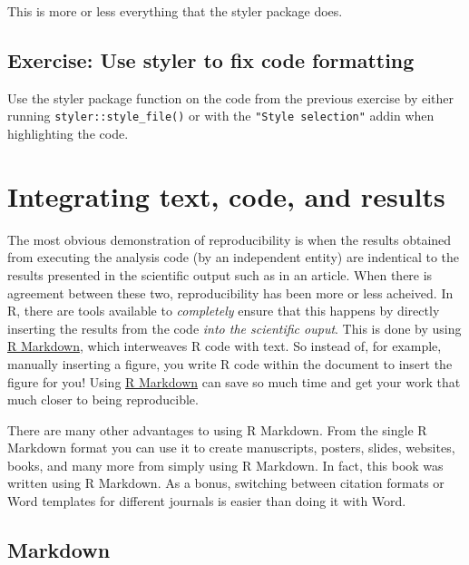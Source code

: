 \documentclass[]{Nemilov}
\begin{document}
This is more or less everything that the styler package does.

\hypertarget{exercise-use-styler-to-fix-code-formatting}{%
\subsection{Exercise: Use styler to fix code formatting}\label{exercise-use-styler-to-fix-code-formatting}}

Use the styler package function on the code from the previous exercise by either
running \texttt{styler::style\_file()} or with the \texttt{"Style\ selection"} addin when
highlighting the code.

\hypertarget{r-reproducibility-markdown}{%
\section{Integrating text, code, and results}\label{r-reproducibility-markdown}}

The most obvious demonstration of reproducibility is when the results obtained
from executing the analysis code (by an independent entity) are indentical to
the results presented in the scientific output such as in an article. When there
is agreement between these two, reproducibility has been more or less acheived.
In R, there are tools available to \emph{completely} ensure that this happens by
directly inserting the results from the code \emph{into the scientific ouput}. This is
done by using \href{https://rmarkdown.rstudio.com/}{R Markdown}, which interweaves R code with text.
So instead of, for example, manually inserting a figure, you write R code within
the document to insert the figure for you! Using \href{https://rmarkdown.rstudio.com/}{R Markdown} can
save so much time and get your work that much closer to being reproducible.

There are many other advantages to using R Markdown. From the single R Markdown
format you can use it to create manuscripts, posters, slides, websites, books,
and many more from simply using R Markdown. In fact, this book was written using
R Markdown. As a bonus, switching between citation formats or Word templates for
different journals is easier than doing it with Word.

\hypertarget{markdown}{%
\subsection{Markdown}\label{markdown}}
\end{document}
